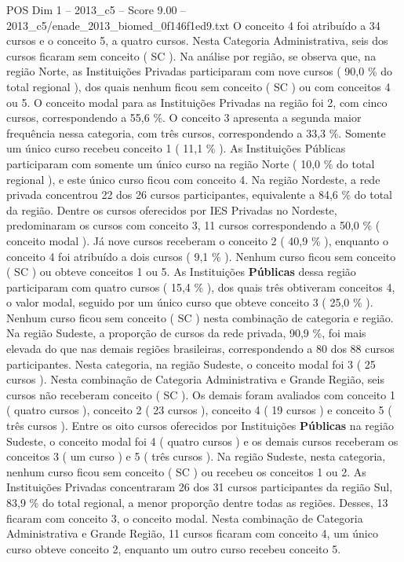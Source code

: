 \begin{textsample}{POS Dim 1 – 2013\_c5 – Score 9.00 – 2013\_c5/enade\_2013\_biomed\_0f146f1ed9.txt}
O conceito 4 foi atribuído a 34 cursos e o conceito 5, a quatro cursos.
Nesta Categoria Administrativa, seis dos cursos ficaram sem conceito ( SC ).
Na análise por região, se observa que, na região Norte, as Instituições Privadas participaram com nove cursos ( 90,0 \% do total regional ), dos quais nenhum ficou sem conceito ( SC ) ou com conceitos 4 ou 5.
O conceito modal para as Instituições Privadas na região foi 2, com cinco cursos, correspondendo a 55,6 \%.
O conceito 3 apresenta a segunda maior frequência nessa categoria, com três cursos, correspondendo a 33,3 \%.
Somente um único curso recebeu conceito 1 ( 11,1 \% ).
As Instituições Públicas participaram com somente um único curso na região Norte ( 10,0 \% do total regional ), e este único curso ficou com conceito 4.
Na região Nordeste, a rede privada concentrou 22 dos 26 cursos participantes, equivalente a 84,6 \% do total da região.
Dentre os cursos oferecidos por IES Privadas no Nordeste, predominaram os cursos com conceito 3, 11 cursos correspondendo a 50,0 \% ( conceito modal ).
Já nove cursos receberam o conceito 2 ( 40,9 \% ), enquanto o conceito 4 foi atribuído a dois cursos ( 9,1 \% ).
Nenhum curso ficou sem conceito ( SC ) ou obteve conceitos 1 ou 5.
As Instituições \textbf{Públicas} dessa região participaram com quatro cursos ( 15,4 \% ), dos quais três obtiveram conceitos 4, o valor modal, seguido por um único curso que obteve conceito 3 ( 25,0 \% ).
Nenhum curso ficou sem conceito ( SC ) nesta combinação de categoria e região.
Na região Sudeste, a proporção de cursos da rede privada, 90,9 \%, foi mais elevada do que nas demais regiões brasileiras, correspondendo a 80 dos 88 cursos participantes.
Nesta categoria, na região Sudeste, o conceito modal foi 3 ( 25 cursos ).
Nesta combinação de Categoria Administrativa e Grande Região, seis cursos não receberam conceito ( SC ).
Os demais foram avaliados com conceito 1 ( quatro cursos ), conceito 2 ( 23 cursos ), conceito 4 ( 19 cursos ) e conceito 5 ( três cursos ).
Entre os oito cursos oferecidos por Instituições \textbf{Públicas} na região Sudeste, o conceito modal foi 4 ( quatro cursos ) e os demais cursos receberam os conceitos 3 ( um curso ) e 5 ( três cursos ).
Na região Sudeste, nesta categoria, nenhum curso ficou sem conceito ( SC ) ou recebeu os conceitos 1 ou 2.
As Instituições Privadas concentraram 26 dos 31 cursos participantes da região Sul, 83,9 \% do total regional, a menor proporção dentre todas as regiões.
Desses, 13 ficaram com conceito 3, o conceito modal.
Nesta combinação de Categoria Administrativa e Grande Região, 11 cursos ficaram com conceito 4, um único curso obteve conceito 2, enquanto um outro curso recebeu conceito 5.

\end{textsample}
